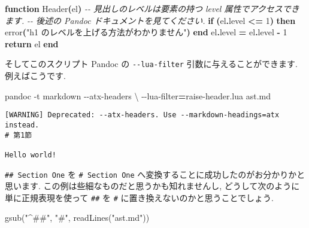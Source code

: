 \documentclass[
  11pt,
  lualatex,ja=standard,jafont=noto]{bxjsreport}
\newenvironment{Shaded}{\begin{snugshade}}{\end{snugshade}}
\newcommand{\AttributeTok}[1]{\textcolor[rgb]{0.77,0.63,0.00}{#1}}
\newcommand{\CommentTok}[1]{\textcolor[rgb]{0.56,0.35,0.01}{\textit{#1}}}
\newcommand{\ControlFlowTok}[1]{\textcolor[rgb]{0.13,0.29,0.53}{\textbf{#1}}}
\newcommand{\DataTypeTok}[1]{\textcolor[rgb]{0.13,0.29,0.53}{#1}}
\newcommand{\DecValTok}[1]{\textcolor[rgb]{0.00,0.00,0.81}{#1}}
\newcommand{\ExtensionTok}[1]{#1}
\newcommand{\FunctionTok}[1]{\textcolor[rgb]{0.00,0.00,0.00}{#1}}
\newcommand{\KeywordTok}[1]{\textcolor[rgb]{0.13,0.29,0.53}{\textbf{#1}}}
\newcommand{\NormalTok}[1]{#1}
\newcommand{\OperatorTok}[1]{\textcolor[rgb]{0.81,0.36,0.00}{\textbf{#1}}}
\newcommand{\StringTok}[1]{\textcolor[rgb]{0.31,0.60,0.02}{#1}}
\begin{document}
\begin{Shaded}
\begin{Highlighting}[numbers=left,,]
\KeywordTok{function}\NormalTok{ Header}\OperatorTok{(}\NormalTok{el}\OperatorTok{)}
  \CommentTok{{-}{-} 見出しのレベルは要素の持つ \textquotesingle{}level\textquotesingle{} 属性でアクセスできます.}
  \CommentTok{{-}{-} 後述の Pandoc ドキュメントを見てください.}
  \ControlFlowTok{if} \OperatorTok{(}\NormalTok{el}\OperatorTok{.}\NormalTok{level }\OperatorTok{\textless{}=} \DecValTok{1}\OperatorTok{)} \ControlFlowTok{then}
    \FunctionTok{error}\OperatorTok{(}\StringTok{"h1 のレベルを上げる方法がわかりません"}\OperatorTok{)}
  \ControlFlowTok{end}
\NormalTok{  el}\OperatorTok{.}\NormalTok{level }\OperatorTok{=}\NormalTok{ el}\OperatorTok{.}\NormalTok{level }\OperatorTok{{-}} \DecValTok{1}
  \ControlFlowTok{return}\NormalTok{ el}
\KeywordTok{end}
\end{Highlighting}
\end{Shaded}

そしてこのスクリプト Pandoc の \texttt{-\/-lua-filter} 引数に与えることができます. 例えばこうです.

\begin{Shaded}
\begin{Highlighting}[numbers=left,,]
\ExtensionTok{pandoc} \AttributeTok{{-}t}\NormalTok{ markdown }\AttributeTok{{-}{-}atx{-}headers} \DataTypeTok{\textbackslash{}}
  \AttributeTok{{-}{-}lua{-}filter}\OperatorTok{=}\NormalTok{raise{-}header.lua ast.md}
\end{Highlighting}
\end{Shaded}

\begin{verbatim}
[WARNING] Deprecated: --atx-headers. Use --markdown-headings=atx instead.
# 第1節

Hello world!
\end{verbatim}

\texttt{\#\# Section One} を \texttt{\# Section One} へ変換することに成功したのがお分かりかと思います. この例は些細なものだと思うかも知れませんし, どうして次のように単に正規表現を使って \texttt{\#\#} を \texttt{\#} に置き換えないのかと思うことでしょう.

\begin{Shaded}
\begin{Highlighting}[numbers=left,,]
\FunctionTok{gsub}\NormalTok{(}\StringTok{"\^{}\#\#"}\NormalTok{, }\StringTok{"\#"}\NormalTok{, }\FunctionTok{readLines}\NormalTok{(}\StringTok{"ast.md"}\NormalTok{))}
\end{Highlighting}
\end{Shaded}
\end{document}
